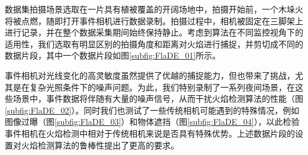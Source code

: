 数据集拍摄场景选取在一片具有植被覆盖的开阔场地中，拍摄开始前，一个木垛火将被点燃，随即打开事件相机进行数据录制。拍摄过程中，相机被固定在三脚架上进行记录，并在整个数据采集期间始终保持静止。考虑到算法在不同监控视角下的适用性，我们选取有明显区别的拍摄角度和距离对火焰进行捕捉，并剪切成不同的数据片段，其中一个数据片段如图\ref{subfig:FlaDE_01}所示。

事件相机对光线变化的高灵敏度虽然提供了优越的捕捉能力，但也带来了挑战，尤其是在复杂光照条件下的噪声问题。为此，我们特别录制了一系列夜间场景，在这些场景中，事件数据将伴随有大量的噪声信号，从而干扰火焰检测算法的性能（图\ref{subfig:FlaDE_02}）。同时我们也测试了一些传统相机可能遇到的特殊情况，例如图像过曝（图\ref{subfig:FlaDE_03}）和物体遮挡（图\ref{subfig:FlaDE_04}），以此检验事件相机在火焰检测中相对于传统相机来说是否具有特殊优势。上述数据片段的设置对火焰检测算法的鲁棒性提出了更高的要求。

